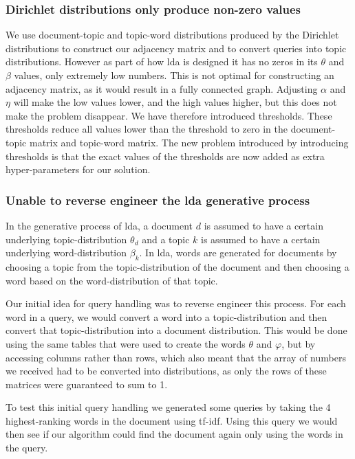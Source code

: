 \subsubsection{Dirichlet distributions only produce non-zero values}
We use document-topic and topic-word distributions produced by the Dirichlet distributions to construct our adjacency matrix and to convert queries into topic distributions. 
However as part of how \gls{lda} is designed it has no zeros in its $\theta$ and $\beta$ values, only extremely low numbers.
This is not optimal for constructing an adjacency matrix, as it would result in a fully connected graph.
Adjusting $\alpha$ and $\eta$ will make the low values lower, and the high values higher, but this does not make the problem disappear.
We have therefore introduced thresholds.
These thresholds reduce all values lower than the threshold to zero in the document-topic matrix and topic-word matrix.
The new problem introduced by introducing thresholds is that the exact values of the thresholds are now added as extra hyper-parameters for our solution.

\subsubsection{Unable to reverse engineer the \gls{lda} generative process}
In the generative process of \gls{lda}, a document $d$ is assumed to have a certain underlying topic-distribution $\theta_d$ and a topic $k$ is assumed to have a certain underlying word-distribution $\beta_k$.
In \gls{lda}, words are generated for documents by choosing a topic from the topic-distribution of the document and then choosing a word based on the word-distribution of that topic.

Our initial idea for query handling was to reverse engineer this process.
For each word in a query, we would convert a word into a topic-distribution and then convert that topic-distribution into a document distribution.
This would be done using the same tables that were used to create the words $\theta$ and $\varphi$, but by accessing columns rather than rows, which also meant that the array of numbers we received had to be converted into distributions, as only the rows of these matrices were guaranteed to sum to 1.

To test this initial query handling we generated some queries by taking the 4 highest-ranking words in the document using tf-idf. Using this query we would then see if our algorithm could find the document again only using the words in the query.

